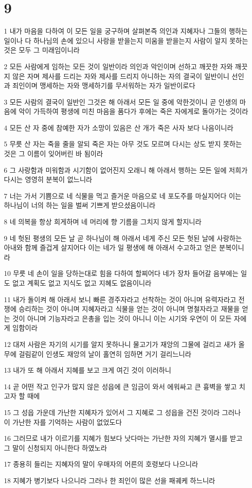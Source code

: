 \chapter{9}

\par 1 내가 마음을 다하여 이 모든 일을 궁구하며 살펴본즉 의인과 지혜자나 그들의 행하는 일이나 다 하나님의 손에 있으니 사랑을 받을는지 미움을 받을는지 사람이 알지 못하는 것은 모두 그 미래임이니라
\par 2 모든 사람에게 임하는 모든 것이 일반이라 의인과 악인이며 선하고 깨끗한 자와 깨끗지 않은 자며 제사를 드리는 자와 제사를 드리지 아니하는 자의 결국이 일반이니 선인과 죄인이며 맹세하는 자와 맹세하기를 무서워하는 자가 일반이로다
\par 3 모든 사람의 결국이 일반인 그것은 해 아래서 모든 일 중에 악한것이니 곧 인생의 마음에 악이 가득하여 평생에 미친 마음을 품다가 후에는 죽은 자에게로 돌아가는 것이라
\par 4 모든 산 자 중에 참예한 자가 소망이 있음은 산 개가 죽은 사자 보다 나음이니라
\par 5 무릇 산 자는 죽을 줄을 알되 죽은 자는 아무 것도 모르며 다시는 상도 받지 못하는 것은 그 이름이 잊어버린 바 됨이라
\par 6 그 사랑함과 미워함과 시기함이 없어진지 오래니 해 아래서 행하는 모든 일에 저희가 다시는 영영히 분복이 없느니라
\par 7 너는 가서 기쁨으로 네 식물을 먹고 즐거운 마음으로 네 포도주를 마실지어다 이는 하나님이 너의 하는 일을 벌써 기쁘게 받으셨음이니라
\par 8 네 의복을 항상 희게하며 네 머리에 향 기름을 그치지 않게 할지니라
\par 9 네 헛된 평생의 모든 날 곧 하나님이 해 아래서 네게 주신 모든 헛된 날에 사랑하는 아내와 함께 즐겁게 살지어다 이는 네가 일 평생에 해 아래서 수고하고 얻은 분복이니라
\par 10 무릇 네 손이 일을 당하는대로 힘을 다하여 할찌어다 네가 장차 들어갈 음부에는 일도 없고 계획도 없고 지식도 없고 지혜도 없음이니라
\par 11 내가 돌이켜 해 아래서 보니 빠른 경주자라고 선착하는 것이 아니며 유력자라고 전쟁에 승리하는 것이 아니며 지혜자라고 식물을 얻는 것이 아니며 명철자라고 재물을 얻는 것이 아니며 기능자라고 은총을 입는 것이 아니니 이는 시기와 우연이 이 모든 자에게 임함이라
\par 12 대저 사람은 자기의 시기를 알지 못하나니 물고기가 재앙의 그물에 걸리고 새가 올무에 걸림같이 인생도 재앙의 날이 홀연히 임하면 거기 걸리느니라
\par 13 내가 또 해 아래서 지혜를 보고 크게 여긴 것이 이러하니
\par 14 곧 어떤 작고 인구가 많지 않은 성읍에 큰 임금이 와서 에워싸고 큰 흉벽을 쌓고 치고자 할 때에
\par 15 그 성읍 가운데 가난한 지혜자가 있어서 그 지혜로 그 성읍을 건진 것이라 그러나 이 가난한 자를 기억하는 사람이 없었도다
\par 16 그러므로 내가 이르기를 지혜가 힘보다 낫다마는 가난한 자의 지혜가 멸시를 받고 그 말이 신청되지 아니한다 하였노라
\par 17 종용히 들리는 지혜자의 말이 우매자의 어른의 호령보다 나으니라
\par 18 지혜가 병기보다 나으니라 그러나 한 죄인이 많은 선을 패궤케 하느니라


